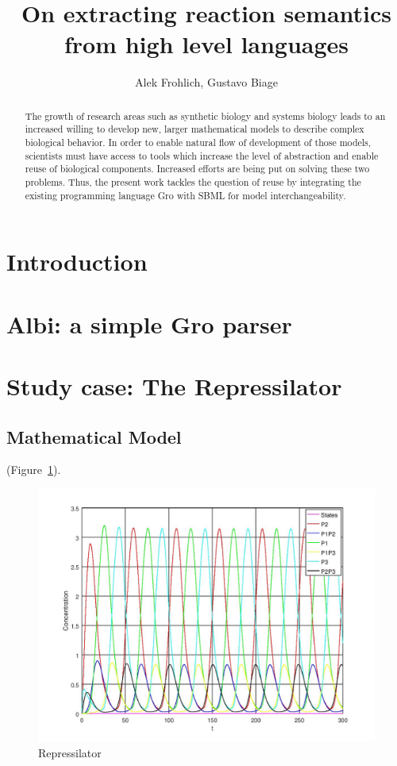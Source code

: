 \documentclass[12pt]{article}
\title{On extracting reaction semantics from high level languages}
\author{Alek Frohlich\inst{1}, Gustavo Biage\inst{1}}
\begin{document}
 

\maketitle

\begin{abstract}
    The growth of research areas such as synthetic biology and systems biology leads to an increased willing to develop new, larger mathematical models to describe complex biological behavior. In order to enable natural flow of development of those models, scientists must have access to tools which increase the level of abstraction and enable reuse of biological components. Increased efforts are being put on solving these two problems.
    Thus, the present work tackles the question of reuse by integrating the existing programming language Gro with SBML for model interchangeability.
\end{abstract}

\section{Introduction}
    \lipsum[1]

\section{Albi: a simple Gro parser}
    \lipsum[1]

\section{Study case: The Repressilator}
    \lipsum[1]

\subsection{Mathematical Model}
    \lipsum[1]
    \cite{Hucka2003}
    (Figure~\ref{fig:repressilator}).

\begin{figure}[ht]
\centering
\includegraphics[width=.5\textwidth]{repressilator.jpg}
\caption{Repressilator}
\label{fig:repressilator}
\end{figure}
\end{document}
